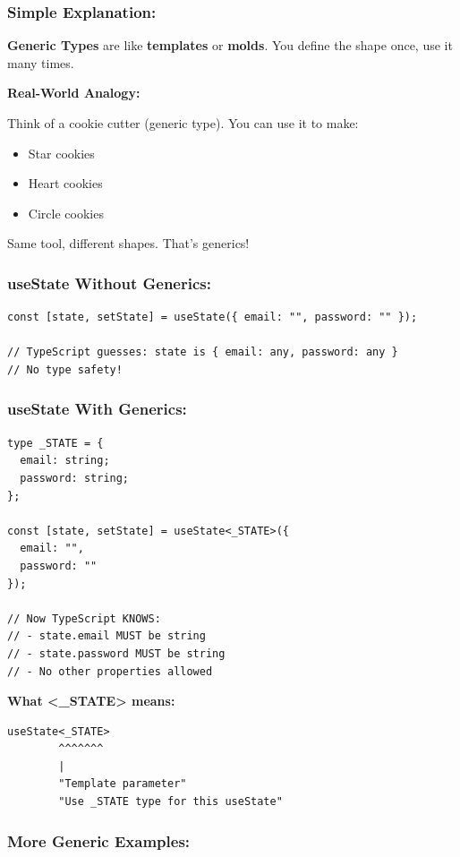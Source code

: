 \documentclass[12pt]{article}
\begin{document}
\subsubsection*{Simple Explanation:}

\textbf{Generic Types} are like \textbf{templates} or \textbf{molds}. You define the shape once, use it many times.

\textbf{Real-World Analogy:}

Think of a cookie cutter (generic type). You can use it to make:
\begin{itemize}
    \item Star cookies
    \item Heart cookies
    \item Circle cookies
\end{itemize}

Same tool, different shapes. That's generics!

\subsubsection*{useState Without Generics:}

\begin{lstlisting}
const [state, setState] = useState({ email: "", password: "" });

// TypeScript guesses: state is { email: any, password: any }
// No type safety!
\end{lstlisting}

\subsubsection*{useState With Generics:}

\begin{lstlisting}
type _STATE = {
  email: string;
  password: string;
};

const [state, setState] = useState<_STATE>({
  email: "",
  password: ""
});

// Now TypeScript KNOWS:
// - state.email MUST be string
// - state.password MUST be string
// - No other properties allowed
\end{lstlisting}

\textbf{What <\_STATE> means:}
\begin{lstlisting}
useState<_STATE>
        ^^^^^^^
        |
        "Template parameter"
        "Use _STATE type for this useState"
\end{lstlisting}

\subsubsection*{More Generic Examples:}
\end{document}
